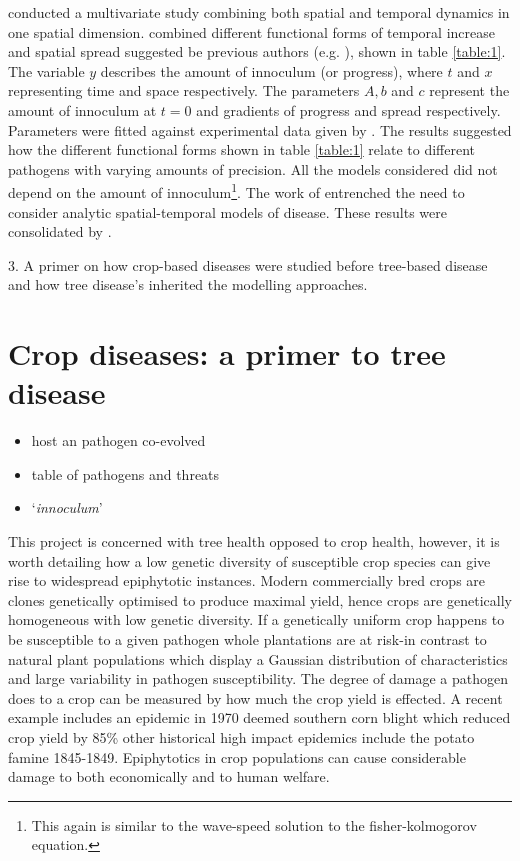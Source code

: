     \cite{jeger1983analysing} conducted a multivariate study combining both spatial and temporal dynamics in one spatial dimension. \cite{jeger1983analysing} combined different functional forms of temporal increase and spatial spread suggested be previous authors (e.g. \cite{van2013plant, doi:10.1146/annurev.py.06.090168.001201}), shown in table \ref{table:1}. The variable $y$ describes the amount of innoculum (or progress), where $t$ and $x$ representing time and space respectively. The parameters  $A, b$ and $c$ represent the amount of innoculum at $t=0$ and gradients of progress and spread respectively. Parameters were fitted against experimental data given by \cite{berger1979spatial}. The results suggested how the different functional forms shown in table \ref{table:1} relate to different pathogens with varying amounts of precision. All the models considered did not depend on the amount of innoculum\footnote{This again is similar to the wave-speed solution to the fisher-kolmogorov equation.}. The work of \cite{jeger1983analysing} entrenched the need to consider analytic spatial-temporal models of disease. These results were consolidated by \cite{campbell1990introduction}.
    

3. A primer on how crop-based diseases were studied before tree-based disease and how tree disease's inherited the modelling approaches.

\section{Crop diseases: a primer to tree disease }
    \label{chapter:lit-rev}
    \begin{itemize}
        \item host an pathogen co-evolved
        \item table of pathogens and threats
        \item `\textit{innoculum}'
    \end{itemize}
    
     This project is concerned with tree health opposed to crop health, however, it is worth detailing how a low genetic diversity of susceptible crop species can give rise to widespread epiphytotic instances. Modern commercially bred crops are clones genetically optimised to produce maximal yield, hence crops are genetically homogeneous with low genetic diversity. If a genetically uniform crop happens to be susceptible to a given pathogen whole plantations are at risk\--in contrast to natural plant populations which display a Gaussian distribution of characteristics and large variability in pathogen susceptibility. The degree of damage a pathogen does to a crop can be measured by how much the crop yield is effected. A recent example includes an epidemic in 1970 deemed southern corn blight which reduced crop yield by 85\% \cite{Tatum1113} other historical high impact epidemics include the potato famine 1845-1849. Epiphytotics in crop populations can cause considerable damage to both economically and to human welfare. 
    
